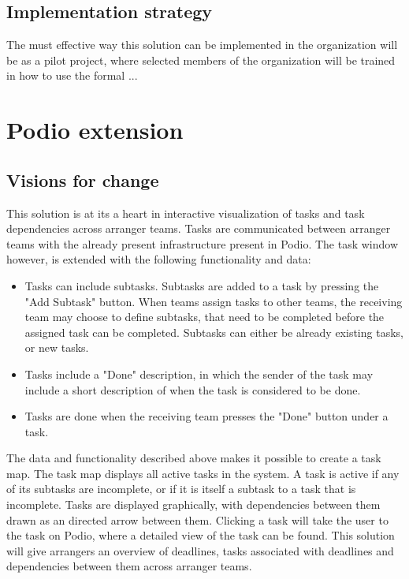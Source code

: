 \subsection{Implementation strategy}
The must effective way this solution can be implemented in the organization will be as a pilot project, where selected members of the organization will be trained in how to use the formal ... 



\section{Podio extension}
\subsection{Visions for change}
\label{visions_for_change}
This solution is at its a heart in interactive visualization of tasks and task dependencies across arranger teams. Tasks are communicated between arranger teams with the already present infrastructure present in Podio. The task window however, is extended with the following functionality and data:
\begin{itemize}
    \item Tasks can include subtasks. Subtasks are added to a task by pressing the "Add Subtask" button. When teams assign tasks to other teams, the receiving team may choose to define subtasks, that need to be completed before the assigned task can be completed. Subtasks can either be already existing tasks, or new tasks.
    \item Tasks include a "Done" description, in which the sender of the task may include a short description of when the task is considered to be done.
    \item Tasks are done when the receiving team presses the "Done" button under a task.
\end{itemize}
The data and functionality described above makes it possible to create a task map. The task map displays all active tasks in the system. A task is active if any of its subtasks are incomplete, or if it is itself a subtask to a task that is incomplete. Tasks are displayed graphically, with dependencies between them drawn as an directed arrow between them. Clicking a task will take the user to the task on Podio, where a detailed view of the task can be found. This solution will give arrangers an overview of deadlines, tasks associated with deadlines and dependencies between them across arranger teams.


